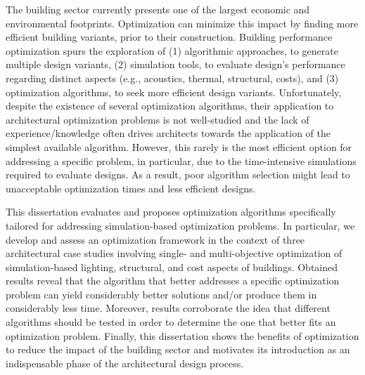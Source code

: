 \noindent 

The building sector currently presents one of the largest economic and environmental footprints. Optimization can minimize this impact by finding more efficient building variants, prior to their construction. Building performance optimization spurs the exploration of (1) algorithmic approaches, to generate multiple design variants, (2) simulation tools, to evaluate design's performance regarding distinct aspects (e.g., acoustics, thermal, structural, costs), and (3) optimization algorithms, to seek more efficient design variants. Unfortunately, despite the existence of several optimization algorithms, their application to architectural optimization problems is not well-studied and the lack of experience/knowledge often drives architects towards the application of the simplest available algorithm. However, this rarely is the most efficient option for addressing a specific problem, in particular, due to the time-intensive simulations required to evaluate designs. As a result, poor algorithm selection might lead to unacceptable optimization times and less efficient designs. 

This dissertation evaluates and proposes optimization algorithms specifically tailored for addressing simulation-based optimization problems. In particular, we develop and assess an optimization framework in the context of three architectural case studies involving single- and multi-objective optimization of simulation-based lighting, structural, and cost aspects of buildings. Obtained results reveal that the algorithm that better addresses a specific optimization problem can yield considerably better solutions and/or produce them in considerably less time. Moreover, results corroborate the idea that different algorithms should be tested in order to determine the one that better fits an optimization problem. Finally, this dissertation shows the benefits of optimization to reduce the impact of the building sector and motivates its introduction as an indispensable phase of the architectural design process.
